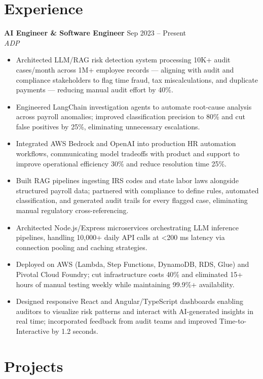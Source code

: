\documentclass[10pt,letterpaper]{article}
\newcommand{\entry}[3]{%
  \vspace{3pt}\textbf{#1} \hfill #3 \\
  \textit{\small #2}\vspace{1pt}}
\begin{document}
\section{Experience}

\entry{AI Engineer \& Software Engineer}{ADP}{Sep 2023 -- Present}
\begin{itemize}
  \item Architected LLM/RAG risk detection system processing 10K+ audit cases/month across 1M+ employee records --- aligning with audit and compliance stakeholders to flag time fraud, tax miscalculations, and duplicate payments --- reducing manual audit effort by 40\%.
  \item Engineered LangChain investigation agents to automate root-cause analysis across payroll anomalies; improved classification precision to 80\% and cut false positives by 25\%, eliminating unnecessary escalations.
  \item Integrated AWS Bedrock and OpenAI into production HR automation workflows, communicating model tradeoffs with product and support to improve operational efficiency 30\% and reduce resolution time 25\%.
  \item Built RAG pipelines ingesting IRS codes and state labor laws alongside structured payroll data; partnered with compliance to define rules, automated classification, and generated audit trails for every flagged case, eliminating manual regulatory cross-referencing.
  \item Architected Node.js/Express microservices orchestrating LLM inference pipelines, handling 10,000+ daily API calls at \textless{}200 ms latency via connection pooling and caching strategies.
  \item Deployed on AWS (Lambda, Step Functions, DynamoDB, RDS, Glue) and Pivotal Cloud Foundry; cut infrastructure costs 40\% and eliminated 15+ hours of manual testing weekly while maintaining 99.9\%+ availability.
  \item Designed responsive React and Angular/TypeScript dashboards enabling auditors to visualize risk patterns and interact with AI-generated insights in real time; incorporated feedback from audit teams and improved Time-to-Interactive by 1.2 seconds.
\end{itemize}

\section{Projects}
\end{document}
